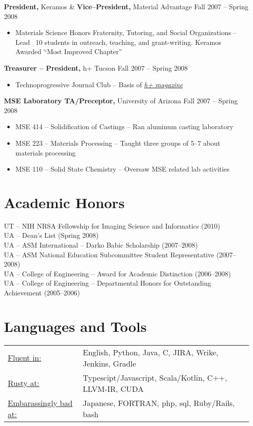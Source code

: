 \documentclass{res}
\begin{document}
\begin{resume}
{\bf President,} Keramos \& {\bf Vice--President,} Material Advantage  \hfill  Fall 2007 -- Spring 2008
\begin{itemize} \itemsep -2pt
  \item Materials Science Honors Fraternity, Tutoring, and Social Organizations -- Lead ~10 students in outreach,
    teaching, and grant-writing. Keramos Awarded ``Most Improved Chapter''
\end{itemize}

{\bf Treasurer -- President,} h+ Tucson \hfill Fall 2007 -- Spring 2008
\begin{itemize} \itemsep -2pt
  \item Technoprogressive Journal Club -- Basis of \href{http://hplusmagazine.com/}{\textit{h+ magazine}}
\end{itemize}

{\bf MSE Laboratory TA/Preceptor,} University of Arizona \hfill Fall 2007 -- Spring 2008
\begin{itemize} \itemsep -2pt
  \item MSE 414 -- Solidification of Castings -- Ran aluminum casting laboratory
  \item MSE 223 -- Materials Processing -- Taught three groups of 5--7 about materials processing
  \item MSE 110 -- Solid State Chemistry -- Oversaw MSE related lab activities
\end{itemize}

\section{Academic Honors}
UT -- NIH NRSA Fellowship for Imaging Science and Informatics (2010)\\
UA -- Dean’s List (Spring 2008) \\
UA -- ASM International -- Darko Babic Scholarship (2007--2008) \\
UA -- ASM National Education Subcommittee Student Representative (2007--2008) \\
UA -- College of Engineering -- Award for Academic Distinction (2006--2008) \\
UA -- College of Engineering -- Departmental Honors for Outstanding Achievement (2005--2006)

\section{Languages and Tools}
   \begin{tabular}{l p{5.5in}}
    \underline{Fluent in:} & English, Python, Java, C, JIRA, Wrike, Jenkins, Gradle \\
    \underline{Rusty at:}  & Typescipt/Javascript, Scala/Kotlin, C++, LLVM-IR, CUDA \\
    \underline{Embarassingly bad at:} & Japanese, FORTRAN, php, sql, Ruby/Rails, bash
   \end{tabular}


\end{resume}
\end{document}
